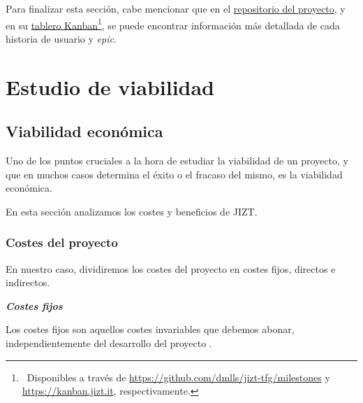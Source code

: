 Para finalizar esta sección, cabe mencionar que en el \href{https://github.com/dmlls/jizt-tfg/milestones}{repositorio del proyecto}, y en su \href{https://web.archive.org/web/20210224162004/https://board.jizt.it/public/board/c08ea3322e2876652a0581e79d6430e2dc0c27720d8a06d7853e84c3cd2b}{tablero Kanban}\footnote{\, Disponibles a través de \href{https://github.com/dmlls/jizt-tfg/milestones}{https://github.com/dmlls/jizt-tfg/milestones} y \\ \href{https://kanban.jizt.it}{https://kanban.jizt.it}, respectivamente.}, se puede encontrar información más detallada de cada historia de usuario y \emph{epic}.

\vspace{2cm}

\section{Estudio de viabilidad}

\subsection{Viabilidad económica}

Uno de los puntos cruciales a la hora de estudiar la viabilidad de un proyecto, y que en muchos casos determina el éxito o el fracaso del mismo, es la viabilidad económica.

En esta sección analizamos los costes y beneficios de JIZT.


\subsubsection{Costes del proyecto}

En nuestro caso, dividiremos los costes del proyecto en costes fijos, directos e indirectos.

\vspace{0.4cm}
\noindent
\textbf{\emph{Costes fijos}}

Los costes fijos son aquellos costes invariables que debemos abonar, independientemente del desarrollo del proyecto \cite{perez18}.

